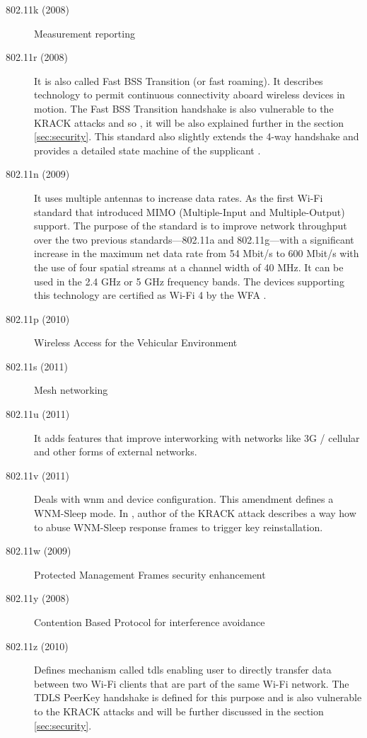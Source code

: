 \begin{description}
\item [802.11k (2008)] Measurement reporting

\item [802.11r (2008)] It is also called Fast BSS Transition (or fast roaming). It describes technology to permit continuous connectivity aboard wireless devices in motion. The Fast BSS Transition handshake is also vulnerable to the KRACK attacks and so \cite{VA17}, it will be also explained further in the section \ref{sec:security}. This standard also slightly extends the 4-way handshake and provides a detailed state machine of the supplicant \cite{ieee802.11r_2008}.

\item[802.11n (2009)] It uses multiple antennas to increase data rates. As the first Wi-Fi standard that introduced MIMO (Multiple-Input and Multiple-Output) support. The purpose of the standard is to improve network throughput over the two previous standards—802.11a and 802.11g—with a significant increase in the maximum net data rate from 54 Mbit/s to 600 Mbit/s with the use of four spatial streams at a channel width of 40 MHz. It can be used in the 2.4 GHz or 5 GHz frequency bands. The devices supporting this technology are certified as Wi-Fi 4 by the WFA \cite{wi-fi6}.

\item[802.11p (2010)] Wireless Access for the Vehicular Environment

\item[802.11s (2011)] Mesh networking

\item[802.11u (2011)] It adds features that improve interworking with networks like 3G / cellular and other forms of external networks.

\item[802.11v (2011)] Deals with \gls{wnm} and device configuration. This amendment defines a WNM-Sleep mode. In \cite{VA_ccs2018}, author of the KRACK attack describes a way how to abuse WNM-Sleep response frames to trigger key reinstallation. 

\item[802.11w (2009)] Protected Management Frames security enhancement

\item[802.11y (2008)] Contention Based Protocol for interference avoidance

\item[802.11z (2010)] Defines mechanism called \gls{tdls} enabling user to directly transfer data between two Wi-Fi clients that are part of the same Wi-Fi network. The TDLS PeerKey handshake is defined for this purpose and is also vulnerable to the KRACK attacks \cite{VA_ccs2018} and will be further discussed in the section \ref{sec:security}.


\end{description}
